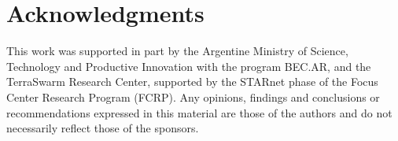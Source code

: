 \documentclass{article}
\begin{document}
\section*{Acknowledgments} 
 
This work was supported in part by the Argentine Ministry of Science, Technology and Productive Innovation with the program BEC.AR, and the TerraSwarm Research Center, supported by the STARnet phase of the Focus Center Research Program (FCRP). Any opinions, findings and conclusions or recommendations expressed in this material are those of the authors and do not necessarily reflect those of the sponsors.

\small


\end{document}
